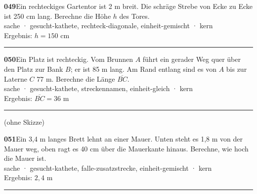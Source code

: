 \documentclass[10pt]{article}
\begin{document}
\begin{minipage}[t]{\linewidth}
\parbox[t]{5.8cm}{}\hfill\parbox[t]{11.6cm}{\textbf{049}\quad Ein rechteckiges Gartentor ist 2 m breit. Die schräge Strebe von Ecke zu Ecke ist 250 cm lang. Berechne die Höhe $h$ des Tores.\\[2pt]{\color{gray}\footnotesize sache · gesucht-kathete, rechteck-diagonale, einheit-gemischt · kern\\Ergebnis: $h = 150$ cm}}
\end{minipage}\par\medskip\hrule\medskip
\begin{minipage}[t]{\linewidth}
\parbox[t]{5.8cm}{}\hfill\parbox[t]{11.6cm}{\textbf{050}\quad Ein Platz ist rechteckig. Vom Brunnen $A$ führt ein gerader Weg quer über den Platz zur Bank $B$; er ist 85 m lang. Am Rand entlang sind es von $A$ bis zur Laterne $C$ 77 m. Berechne die Länge $\overline{BC}$.\\[2pt]{\color{gray}\footnotesize sache · gesucht-kathete, streckennamen, einheit-gleich · kern\\Ergebnis: $\overline{BC} = 36$ m}}
\end{minipage}\par\medskip\hrule\medskip
\begin{minipage}[t]{\linewidth}
\parbox[t]{5.8cm}{\parbox[t]{5.5cm}{\color{gray}\small (ohne Skizze)}}\hfill\parbox[t]{11.6cm}{\textbf{051}\quad Ein 3,4 m langes Brett lehnt an einer Mauer. Unten steht es 1,8 m von der Mauer weg, oben ragt es 40 cm über die Mauerkante hinaus. Berechne, wie hoch die Mauer ist.\\[2pt]{\color{gray}\footnotesize sache · gesucht-kathete, falle-zusatzstrecke, einheit-gemischt · kern\\Ergebnis: $2{,}4$ m}}
\end{minipage}\par\medskip\hrule\medskip
\clearpage
\end{document}
